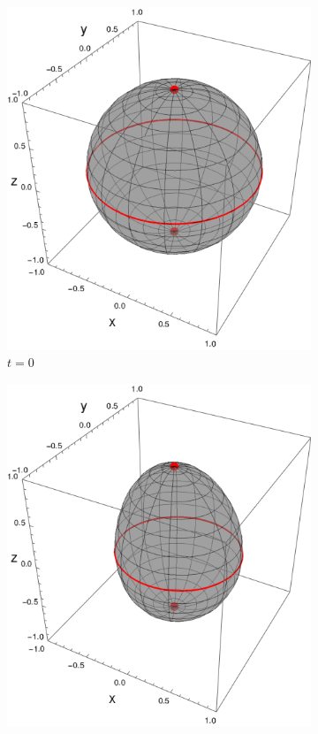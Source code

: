   \begin{figure}[ht!]
    \centering
    \begin{subfigure}{0.32\textwidth}
      \centering
      \includegraphics[width=0.9\linewidth]{chapter3/figures_toy/sphere_CNOT_t=0._r=0.9_p=0.1.png}
      \caption{$t=0$}
    \end{subfigure}%
    \begin{subfigure}{0.32\textwidth}
      \centering
      \includegraphics[width=0.9\linewidth]{chapter3/figures_toy/sphere_CNOT_t=0.5_r=0.9_p=0.9.png}

\end{subfigure}
\end{figure}
